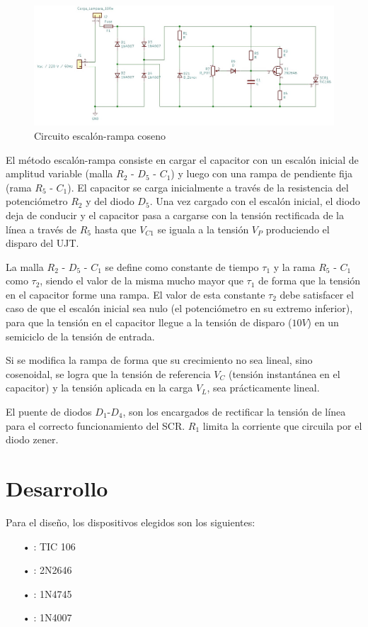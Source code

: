\documentclass{article}
\begin{document}
\begin{figure}[h]
 \begin{center}
	\includegraphics[scale=0.6]{imagenes/fig2.jpg} 
	\caption{Circuito escalón-rampa coseno}\label{fig:fig2}
 \end{center}
\end{figure}

El método escalón-rampa consiste en cargar el capacitor con un escalón inicial de amplitud variable (malla $R_2$ - $D_5$ - $C_1$) y luego con una rampa de pendiente fija (rama $R_5$ - $C_1$). El capacitor se carga inicialmente a través de la resistencia del potenciómetro $R_2$ y del diodo $D_5$. Una vez cargado con el escalón inicial, el diodo deja de conducir y el capacitor pasa a cargarse con la tensión rectificada de la línea a través de $R_5$ hasta que $V_{C1}$ se iguala a la tensión $V_P$ produciendo el disparo del UJT.

La malla $R_2$ - $D_5$ - $C_1$ se define como constante de tiempo $\tau_1$ y la rama $R_5$ - $C_1$ como $\tau_2$, siendo el valor de la misma mucho mayor que $\tau_1$ de forma que la tensión en el capacitor forme una rampa. El valor de esta constante $\tau_2$ debe satisfacer el caso de que el escalón inicial sea nulo (el potenciómetro en su extremo inferior), para que la tensión en el capacitor llegue a la tensión de disparo ($10 V$) en un semiciclo de la tensión de entrada.

Si se modifica la rampa de forma que su crecimiento no sea lineal, sino cosenoidal, se logra que la tensión de referencia $V_C$ (tensión instantánea en el capacitor) y la tensión aplicada en la carga $V_L$, sea prácticamente lineal.

El puente de diodos $D_1$-$D_4$, son los encargados de rectificar la tensión de línea para el correcto funcionamiento del SCR. $R_1$ limita la corriente que circuila por el diodo zener.
%
\section{Desarrollo}
Para el diseño, los dispositivos elegidos son los siguientes:
\begin{itemize}\itemsep0em \itemindent=2em
	\item[•]{: TIC 106}
	\item[•]{: 2N2646}
	\item[•]{: 1N4745}
	\item[•]{: 1N4007}
\end{itemize}
%
\end{document}
